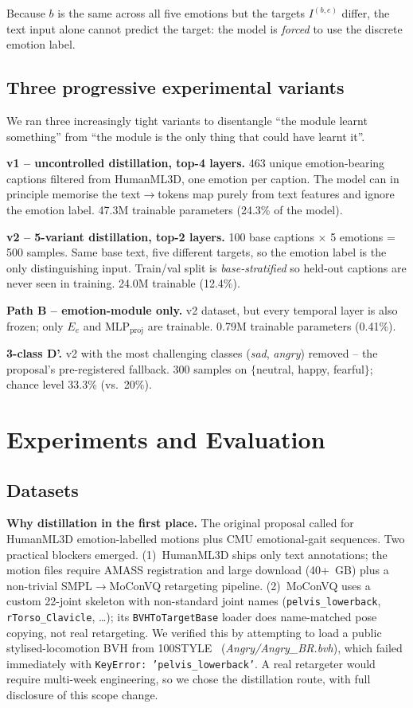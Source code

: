 \documentclass[conference]{IEEEtran}
\begin{document}
Because $b$ is the same across all five emotions but the targets
$I^{(b,e)}$ differ, the text input alone cannot predict the target: the
model is \emph{forced} to use the discrete emotion label.

\subsection{Three progressive experimental variants}
\label{sec:progress}
We ran three increasingly tight variants to disentangle ``the module
learnt something'' from ``the module is the only thing that could have
learnt it''.

\textbf{v1 -- uncontrolled distillation, top-4 layers.} 463 unique
emotion-bearing captions filtered from HumanML3D, one emotion per
caption. The model can in principle memorise the text$\to$tokens map
purely from text features and ignore the emotion label. 47.3M trainable
parameters (24.3\% of the model).

\textbf{v2 -- 5-variant distillation, top-2 layers.} 100 base captions $\times$
5 emotions = 500 samples. Same base text, five different targets, so the
emotion label is the only distinguishing input. Train/val split is
\emph{base-stratified} so held-out captions are never seen in training.
24.0M trainable (12.4\%).

\textbf{Path B -- emotion-module only.} v2 dataset, but every temporal
layer is also frozen; only $E_e$ and $\text{MLP}_{\text{proj}}$ are
trainable. 0.79M trainable parameters (0.41\%).

\textbf{3-class D'.} v2 with the most challenging classes (\textit{sad},
\textit{angry}) removed -- the proposal's pre-registered fallback. 300
samples on $\{$neutral, happy, fearful$\}$; chance level 33.3\% (vs.\
20\%).

\section{Experiments and Evaluation}

\subsection{Datasets}
\label{sec:dataset-gap}

\textbf{Why distillation in the first place.} The original proposal
called for HumanML3D emotion-labelled motions plus CMU emotional-gait
sequences. Two practical blockers emerged. (1)~HumanML3D ships only text
annotations; the motion files require AMASS registration and large
download (40+~GB) plus a non-trivial SMPL$\to$MoConVQ retargeting
pipeline. (2)~MoConVQ uses a custom 22-joint skeleton with non-standard
joint names (\texttt{pelvis\_lowerback},
\texttt{rTorso\_Clavicle}, \ldots); its \texttt{BVHToTargetBase} loader
does name-matched pose copying, not real retargeting. We verified this
by attempting to load a public stylised-locomotion BVH from
100STYLE~\cite{mason2022style} (\textit{Angry/Angry\_BR.bvh}), which
failed immediately with
\texttt{KeyError: 'pelvis\_lowerback'}. A real retargeter would require
multi-week engineering, so we chose the distillation route, with full
disclosure of this scope change.
\end{document}
